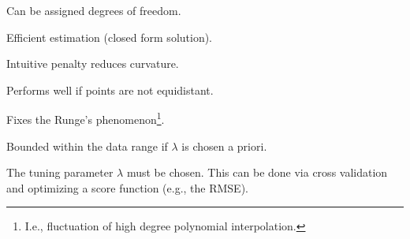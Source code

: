 		\begin{my_pros_cons_table}{
				\item Can be assigned degrees of freedom.
				\item Efficient estimation (closed form solution).
				\item Intuitive penalty reduces curvature.
				\item Performs well if points are not equidistant.
				\item Fixes the Runge's phenomenon\footnote{I.e., fluctuation of high degree polynomial interpolation.}.
				\item Bounded within the data range if $\lambda$ is chosen a priori.
			}{
				\item The tuning parameter $\lambda$ must be chosen. This can be done via cross validation and optimizing a score function (e.g., the RMSE). 
			}
		\end{my_pros_cons_table}



